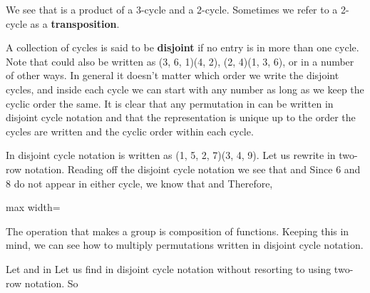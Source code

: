 \documentclass[11pt,oneside]{article}
\begin{document}
\begin{BookBody}

We see that \BookInline{\sigma } is a product of a 3-cycle and a 2-cycle. Sometimes we refer to a 2-cycle as a\textbf{ transposition}.

A collection of cycles is said to be\textbf{ disjoint} if no entry is in more than one cycle. Note that \BookInline{\sigma } could also be written as (3, 6, 1)(4, 2), (2, 4)(1, 3, 6), or in a number of other ways. In general it doesn’t matter which order we write the disjoint cycles, and inside each cycle we can start with any number as long as we keep the cyclic order the same. It is clear that any permutation in  can be written in disjoint cycle notation and that the representation is unique up to the order the cycles are written and the cyclic order within each cycle.

 In disjoint cycle notation is written as (1, 5, 2, 7)(3, 4, 9). Let us rewrite \BookInline{\sigma } in two-row notation. Reading off the disjoint cycle notation we see that   and  Since 6 and 8 do not appear in either cycle, we know that  and  Therefore,

\begin{center}\begin{adjustbox}{max width=\linewidth}\end{adjustbox}\end{center}

\noindent The operation that makes  a group is composition of functions. Keeping this in mind, we can see how to multiply permutations written in disjoint cycle notation.

 Let  and  in  Let us find \BookInline{\sigma \tau } in disjoint cycle notation without resorting to using two-row notation. So


\end{BookBody}
\end{document}

